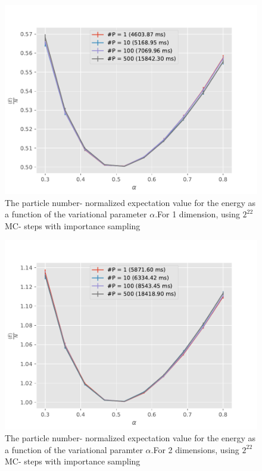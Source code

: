 \documentclass[11pt,a4paper,titlepage]{article}
\begin{document}
\begin{figure}[H]
\centering

\includegraphics[trim=0cm 0.0cm 0cm 1.0cm, clip=true,scale = 0.7]{HarmonicOscillator_SimpleGaussian_D1_2pow22_task_C_1_NoTitle.pdf}
\caption[No interaction, importance sampling (1D)]{The particle number- normalized expectation value for the energy as a function of the variational parameter $\alpha$.For 1 dimension, using $2^{22}$ MC- steps  with importance sampling}\label{imp1d}
\end{figure}

\begin{figure}[H]
\centering

\includegraphics[trim=0cm 0.0cm 0cm 1.0cm, clip=true,scale = 0.7]{HarmonicOscillator_SimpleGaussian_D2_2pow22_task_C_1_NoTitle.pdf}
\caption[No interaction, importance sampling (2D)]{The particle number- normalized expectation value for the energy as a function of the variational paramter $\alpha$.For 2 dimensions, using $2^{22}$ MC- steps  with importance sampling}\label{imp2d}
\end{figure}
\end{document}

